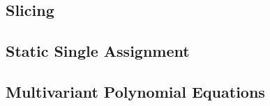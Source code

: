 
\subsection{Slicing}
\label{subsection:slicing}



\subsection{Static Single Assignment}
\label{subsection:static-single-assignment}



\subsection{Multivariant Polynomial Equations}
\label{subsection:multivariant-polynomial-equations}


